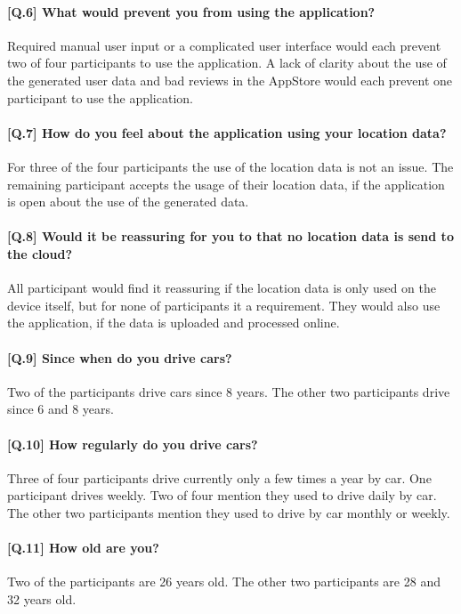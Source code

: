 \paragraph{[Q.6] What would prevent you from using the application?}
Required manual user input or a complicated user interface would each prevent two of four participants to use the application. A lack of clarity about the use of the generated user data and bad reviews in the AppStore would each prevent one participant to use the application.

\paragraph{[Q.7] How do you feel about the application using your location data?}
For three of the four participants the use of the location data is not an issue. The remaining participant accepts the usage of their location data, if the application is open about the use of the generated data. 

\paragraph{[Q.8] Would it be reassuring for you to that no location data is send to the cloud? }
All participant would find it reassuring if the location data is only used on the device itself, but for none of participants it a requirement. They would also use the application, if the data is uploaded and processed online. 

\paragraph{[Q.9] Since when do you drive cars?}
Two of the participants drive cars since 8 years. The other two participants drive since 6 and 8 years. 

\paragraph{[Q.10] How regularly do you drive cars?}
Three of four participants drive currently only a few times a year by car. One participant drives weekly. Two of four mention they used to drive daily by car. The other two participants mention they used to drive by car monthly or weekly. 

\paragraph{[Q.11] How old are you?}
Two of the participants are 26 years old. The other two participants are 28 and 32 years old.


